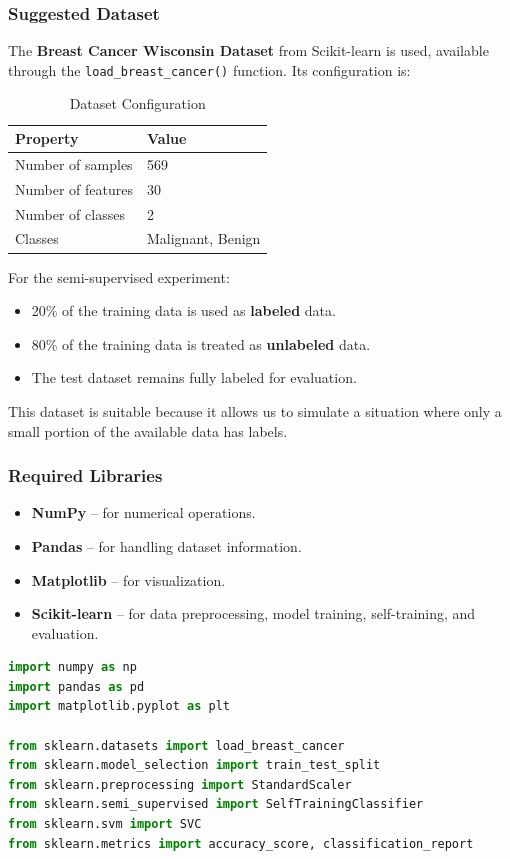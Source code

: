 \documentclass[a4paper,11pt]{article}
\begin{document}
\subsubsection{Suggested Dataset}
The \textbf{Breast Cancer Wisconsin Dataset} from Scikit-learn is used, available through the \texttt{load\_breast\_cancer()} function. Its configuration is:

\begin{table}[H]
\centering
\caption{Dataset Configuration}
\begin{tabular}{ll}
\toprule
\textbf{Property} & \textbf{Value} \\
\midrule
Number of samples  & 569 \\
Number of features & 30 \\
Number of classes  & 2 \\
Classes            & Malignant, Benign \\
\bottomrule
\end{tabular}
\end{table}

For the semi-supervised experiment:
\begin{itemize}
    \item 20\% of the training data is used as \textbf{labeled} data.
    \item 80\% of the training data is treated as \textbf{unlabeled} data.
    \item The test dataset remains fully labeled for evaluation.
\end{itemize}

This dataset is suitable because it allows us to simulate a situation where only a small portion of the available data has labels.

\subsubsection{Required Libraries}
\begin{itemize}
    \item \textbf{NumPy} -- for numerical operations.
    \item \textbf{Pandas} -- for handling dataset information.
    \item \textbf{Matplotlib} -- for visualization.
    \item \textbf{Scikit-learn} -- for data preprocessing, model training, self-training, and evaluation.
\end{itemize}

\begin{lstlisting}[language=Python, caption={Required Imports}]
import numpy as np
import pandas as pd
import matplotlib.pyplot as plt

from sklearn.datasets import load_breast_cancer
from sklearn.model_selection import train_test_split
from sklearn.preprocessing import StandardScaler
from sklearn.semi_supervised import SelfTrainingClassifier
from sklearn.svm import SVC
from sklearn.metrics import accuracy_score, classification_report
\end{lstlisting}
\end{document}
